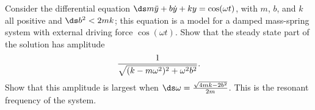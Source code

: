 \begin{exercises}
\exer Consider the differential 
equation $\ds m\ddot y+b\dot y+ky=\cos(\omega t)$,
with $m$, $b$, and $k$ all positive and $\ds b^2<2mk$; this equation
is a model for a damped mass-spring system with external 
driving force $\cos(\omega t)$.
Show that the steady state part of the solution has amplitude
$${1\over \sqrt{(k-m\omega^2)^2+\omega^2b^2}}.$$
Show that this amplitude is largest when 
$\ds \omega={\sqrt{4mk-2b^2}\over 2m}$. This is the 
{\dfont resonant frequency} of the system.

\end{exercises}
